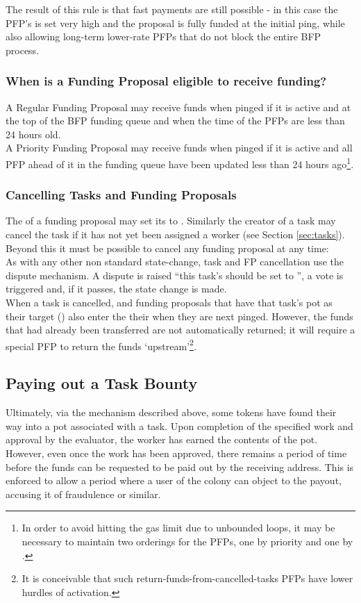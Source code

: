 The result of this rule is that fast payments are still possible - in this case the PFP's  is set very high and the proposal is fully funded at the initial ping, while also allowing long-term lower-rate PFPs that do not block the entire BFP process.

\subsubsection*{When is a Funding Proposal eligible to receive funding?}
A Regular Funding Proposal may receive funds when pinged if it is active and at the top of the BFP funding queue and when the  time of the PFPs are less than 24 hours old.\\
A Priority Funding Proposal may receive funds when pinged if it is active and all PFP ahead of it in the funding queue have been updated less than 24 hours ago\footnote{In order to avoid hitting the gas limit due to unbounded loops, it may be necessary to maintain two orderings for the PFPs, one by priority and one by . }.

\subsubsection{Cancelling Tasks and Funding Proposals}
The  of a funding proposal may set its  to . Similarly the creator of a task may cancel the task if it has not yet been assigned a worker (see Section \ref{sec:tasks}). Beyond this it must be possible to cancel any funding proposal at any time:\\
As with any other non standard state-change, task and FP cancellation use the dispute mechanism. A dispute is raised ``this task's  should be set to '', a vote is triggered and, if it passes, the state change is made.\\
When a task is cancelled, and funding proposals that have that task's pot as their target () also enter the  their  when they are next pinged. However, the funds that had already been transferred are not automatically returned; it will require a special PFP to return the funds `upstream'\footnote{It is conceivable that such return-funds-from-cancelled-tasks PFPs have lower hurdles of activation.}.

\subsection{Paying out a Task Bounty}\label{sec:claiming-bounty}
Ultimately, via the mechanism described above, some tokens have found their way into a pot associated with a task. Upon completion of the specified work and approval by the evaluator, the worker has earned the contents of the pot. However, even once the work has been approved, there remains a period of time before the funds can be requested to be paid out by the receiving address. This is enforced to allow a period where a user of the colony can object to the payout, accusing it of fraudulence or similar.

